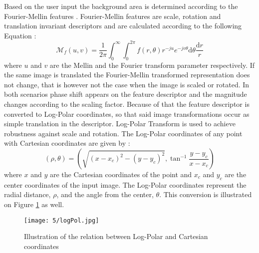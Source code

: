 \documentclass[draft,final]{vutinfth} %
\begin{document}
\par
Based on the user input the background area is determined according to the Fourier-Mellin features \cite{sheng1986circular}.
Fourier-Mellin features are scale, rotation and translation invariant descriptors and are calculated according to the following Equation \cite{kazik2011visual}:
\[\mathcal{M}_f(u,v) = \frac{1}{2\pi} \int_{0}^{\infty}\int_{0}^{2\pi} f(r, \theta)r^{-ju}e^{-jv\theta}\mathrm{d}\theta\frac{\mathrm{d}r}{r}\]
where $u$ and $v$ are the Mellin and the Fourier transform parameter respectively.
If the same image is translated the Fourier-Mellin transformed representation does not change, that is however not the case when the image is scaled or rotated.
In both scenarios phase shift appears on the feature descriptor and the magnitude changes according to the scaling factor.
Because of that the feature descriptor is converted to Log-Polar coordinates, so that said image transformations occur as simple translation in the descriptor.
Log-Polar Transform is used to achieve robustness against scale and rotation.
The Log-Polar coordinates of any point with Cartesian coordinates are given by \cite{sarvaiya2012image}:
\[(\rho,\theta) = (\sqrt{(x-x_c)^2 - (y-y_c)^2}, \tan^{-1}\frac{y-y_c}{x-x_c})\]
where $x$ and $y$ are the Cartesian coordinates of the point and $x_c$ and $y_c$ are the center coordinates of the input image.
The Log-Polar coordinates represent the radial distance, $\rho$, and the angle from the center, $\theta$.
This conversion is illustrated on Figure \ref{fig:sans:logPol} as well.

\begin{figure}[h]
  \centering
  \texttt{[image: 5/logPol.jpg]}
  \caption{Illustration of the relation between Log-Polar and Cartesian coordinates \cite{sarvaiya2012image}}
  \label{fig:sans:logPol} %
\end{figure}
\end{document}
